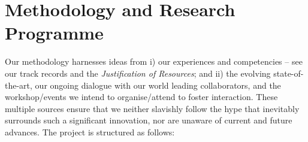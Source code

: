 \documentclass[a4paper,11pt]{article}
\begin{document}



\vspace*{-0.2in}

\section{Methodology and Research Programme}
\vspace*{-0.1in}

Our methodology harnesses ideas from i) our experiences and
competencies -- see our track records and the {\em
  Justification of Resources}; and 
ii) the evolving state-of-the-art, our ongoing dialogue with our
world leading collaborators, and the workshop/events we intend to
organise/attend to foster interaction. These multiple sources ensure that we neither
slavishly follow the hype that inevitably surrounds such a significant
innovation, nor are unaware of current and future advances. The
project is structured as follows:


\end{document}
